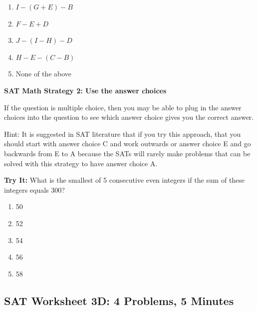 \begin{multienumerate}
{\begin{enumerate}[label=(\Alph*)]
\item $I-(G+E)-B$
\item $F-E+D$
\item $J-(I-H)-D$
\item $H-E-(C-B)$
\item None of the above
\end{enumerate}}

\vfill
{}
\end{multienumerate}

\pagebreak
\textbf{SAT Math Strategy 2: Use the answer choices}

If the question is multiple choice, then you may be able to plug in the answer choices into the question to see which answer choice gives you the correct answer.

\bigskip
Hint: It is suggested in SAT literature that if you try this approach, that you should start with answer choice C and work outwards or answer choice E and go backwards from E to A because the SATs will rarely make problems that can be solved with this strategy to have answer choice A. 

\bigskip
\textbf{Try It:} What is the smallest of 5 consecutive even integers if the sum of these integers equals 300?

\begin{enumerate}[label=(\Alph*)]
\item 50
\item 52
\item 54
\item 56
\item 58
\end{enumerate}

\newpage
\subsection{SAT Worksheet 3D: 4 Problems, 5 Minutes}

